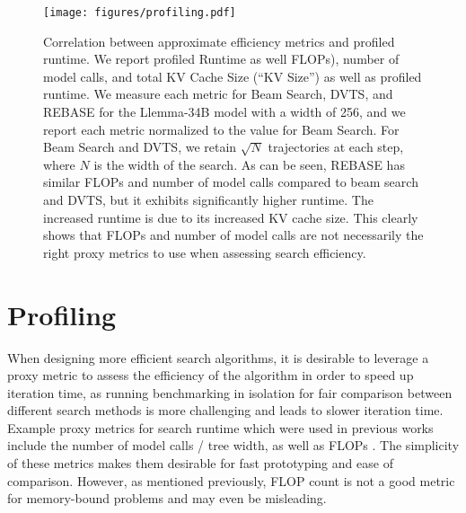 \begin{figure*}[h]%
\centering
\texttt{[image: figures/profiling.pdf]}
\vspace*{-2mm}
 \caption{ 
 Correlation between approximate efficiency metrics and profiled runtime.
 We report profiled Runtime as well FLOPs), number of model calls, and total KV Cache Size (``KV Size'') as well as profiled runtime.
 We measure each metric for Beam Search, DVTS, and REBASE for the Llemma-34B model with a width of 256, and we report each metric normalized to the value for Beam Search.
 For Beam Search and DVTS, we retain $\sqrt{N}$ trajectories at each step, where $N$ is the width of the search.
 As can be seen, REBASE has similar FLOPs and number of model calls compared to beam search and DVTS, but it exhibits significantly higher runtime.
 The increased runtime is due to its increased KV cache size.
 This clearly shows that FLOPs and number of model calls are not necessarily the right proxy metrics to use when assessing search efficiency.
  }
  \label{fig:profiling}
\end{figure*}

\section{Profiling}

\label{sec:profiling}

When designing more efficient search algorithms, it is desirable to leverage a proxy metric to assess the efficiency of the algorithm in order to speed up iteration time, as running benchmarking in isolation for fair comparison between different search methods is more challenging and leads to slower iteration time.
Example proxy metrics for search runtime which were used in previous works include the number of model calls / tree width, as well as FLOPs \cite{qiu2024treebon,wu2024inference,snell2024scaling}.
The simplicity of these metrics makes them desirable for fast prototyping and ease of comparison.
However, as mentioned previously, FLOP count is not a good metric for memory-bound problems and may even be misleading.

